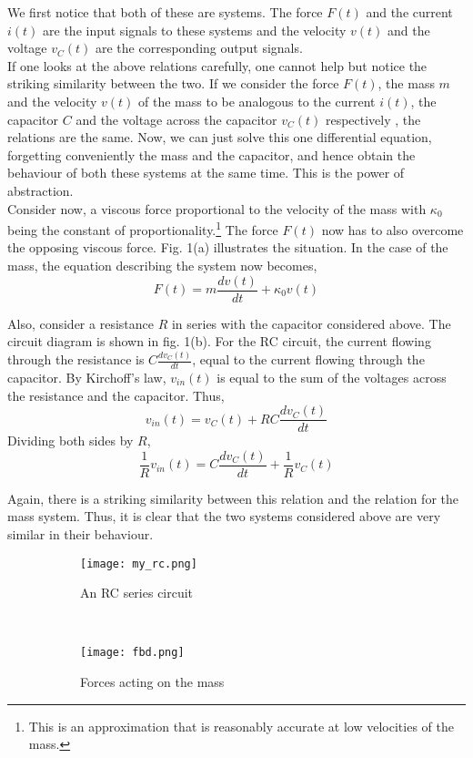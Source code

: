 We first notice that both of these are systems. The force $F(t)$ and the current $i(t)$ are the input signals to these systems and the velocity $v(t)$ and the voltage $v_{C}(t)$ are the corresponding output signals.\\

If one looks at the above relations carefully, one cannot help
but notice the striking similarity between the two. If we consider the
force $F(t)$, the mass $m$ and the velocity $v(t)$ of the mass to be
analogous to the current $i(t)$, the capacitor $C$ and the voltage
across the capacitor $v_{C}(t)$ respectively , the relations are the same. Now, we can just solve this one differential equation, forgetting conveniently the mass and the capacitor, and hence obtain the behaviour of both these systems at the same time. This is the power of abstraction.\\

Consider now, a viscous force proportional to the velocity of the mass with $\kappa_{0}$ being the constant of proportionality.\footnote{This is an approximation that is reasonably accurate at low velocities of the mass.} The force $F(t)$ now has to also overcome the opposing viscous force. Fig. 1(a) illustrates the situation. In the case of the mass, the equation describing the system now becomes,
\[
F(t) = m\frac{dv(t)}{dt} + \kappa_{0}v(t)
\]

Also, consider a resistance $R$ in series with the capacitor considered above. The circuit diagram is shown in fig. 1(b). For the RC circuit, the current flowing through the resistance is $C\frac{dv_{C}(t)}{dt}$, equal to the current flowing through the capacitor. By Kirchoff's law, $v_{in}(t)$ is equal to the sum of the voltages across the resistance and the capacitor. Thus,
\[
v_{in}(t) = v_{C}(t) + RC\frac{dv_{C}(t)}{dt}
\]
Dividing both sides by $R$,
\[
\frac{1}{R}v_{in}(t) = C\frac{dv_{C}(t)}{dt} + \frac{1}{R}v_{C}(t)
\]

Again, there is a striking similarity between this relation and the relation for the mass system. Thus, it is clear that the two systems considered above are very similar in their behaviour.

\begin{figure}[H]
        \centering
        \begin{subfigure}[b]{0.4\textwidth}
                \texttt{[image: my\_rc.png]}
                \caption{An RC series circuit}
        \end{subfigure}
        \quad
	~
        \begin{subfigure}[b]{0.5\textwidth}
                \texttt{[image: fbd.png]}
                \caption{Forces acting on the mass}
        \end{subfigure}
        \caption{}
\end{figure}


